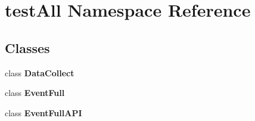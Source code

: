 \section{test\+All Namespace Reference}
\label{namespacetest_all}
\subsection*{Classes}
\begin{DoxyCompactItemize}
\item 
class {\bf Data\+Collect}
\item 
class {\bf Event\+Full}
\item 
class {\bf Event\+Full\+A\+PI}
\end{DoxyCompactItemize}
